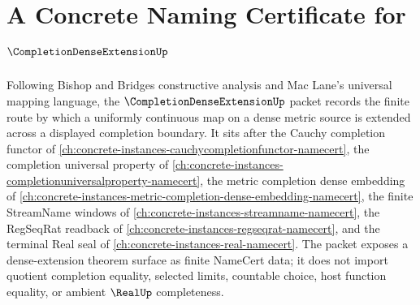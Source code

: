 \chapter{A Concrete Naming Certificate for $\CompletionDenseExtensionUp$}
\label{ch:concrete-instances-completion-dense-extension-namecert}

Following Bishop and Bridges constructive analysis and Mac Lane's universal mapping language, the $\CompletionDenseExtensionUp$ packet records the finite route by which a uniformly continuous map on a dense metric source is extended across a displayed completion boundary. It sits after the Cauchy completion functor of \autoref{ch:concrete-instances-cauchycompletionfunctor-namecert}, the completion universal property of \autoref{ch:concrete-instances-completionuniversalproperty-namecert}, the metric completion dense embedding of \autoref{ch:concrete-instances-metric-completion-dense-embedding-namecert}, the finite StreamName windows of \autoref{ch:concrete-instances-streamname-namecert}, the RegSeqRat readback of \autoref{ch:concrete-instances-regseqrat-namecert}, and the terminal Real seal of \autoref{ch:concrete-instances-real-namecert}. The packet exposes a dense-extension theorem surface as finite NameCert data; it does not import quotient completion equality, selected limits, countable choice, host function equality, or ambient $\RealUp$ completeness.

